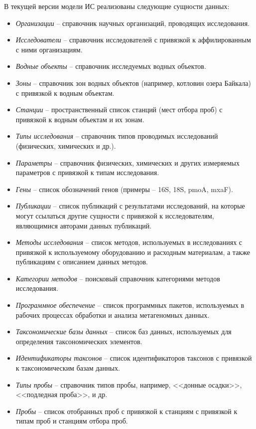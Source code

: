 \documentclass[a4paper,12pt,openany,final]{extreport}
\begin{document}
В текущей версии модели ИС реализованы следующие сущности данных:
\begin{itemize}
\item \emph{Организации} -- справочник научных организаций, проводящих исследования.
\item \emph{Исследователи} -- справочник исследователей с привязкой к аффилированным с ними организациям.
\item \emph{Водные объекты} -- справочник исследуемых водных объектов.
\item \emph{Зоны} -- справочник зон водных объектов (например, котловин озера Байкала) с привязкой к водным объектам.
\item \emph{Станции} -- пространственный список станций (мест отбора проб) с привязкой к водным объектам и их зонам.
\item \emph{Типы исследования} -- справочник типов проводимых исследований (физических, химических и др.).
\item \emph{Параметры} -- справочник физических, химических и других измеряемых параметров с привязкой к типам исследования.
\item \emph{Гены} -- список обозначений генов (примеры -- 16S, 18S, pmoA, mxaF).
\item \emph{Публикации} -- список публикаций с результатами исследований, на которые могут ссылаться другие сущности с привязкой к исследователям, являющимися авторами данных публикаций.
\item \emph{Методы исследования} -- список методов, используемых в исследованиях с привязкой к используемому оборудованию и расходным материалам, а также публикациям с описанием данных методов.
\item \emph{Категории методов} -- поисковый справочник категориями методов исследования.
\item \emph{Программное обеспечение} -- список программных пакетов, используемых в рабочих процессах обработки и анализа метагеномных данных.
\item \emph{Таксономические базы данных} -- список баз данных, используемых для определения таксономических элементов.
\item \emph{Идентификаторы таксонов} -- список идентификаторов таксонов с привязкой к таксономическим базам данных.
\item \emph{Типы пробы} -- справочник типов пробы, например, <<донные осадки>>, <<подледная проба>>, и др.
\item \emph{Пробы} -- список отобранных проб с привязкой к станциям с привязкой к типам проб и станциям отбора проб.

\end{itemize}
\end{document}
